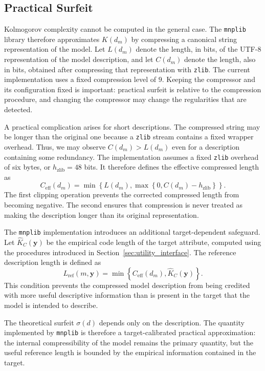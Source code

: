 \subsection*{Practical Surfeit}

Kolmogorov complexity cannot be computed in the general case. The \texttt{mnplib} library therefore approximates $K(d_m)$ by compressing a canonical string representation of the model. Let $L(d_m)$ denote the length, in bits, of the UTF-8 representation of the model description, and let $C(d_m)$ denote the length, also in bits, obtained after compressing that representation with \texttt{zlib}. The current implementation uses a fixed compression level of $9$. Keeping the compressor and its configuration fixed is important: practical surfeit is relative to the compression procedure, and changing the compressor may change the regularities that are detected.

A practical complication arises for short descriptions. The compressed string may be longer than the original one because a \texttt{zlib} stream contains a fixed wrapper overhead. Thus, we may observe $C(d_m)>L(d_m)$ even for a description containing some redundancy. The implementation assumes a fixed \texttt{zlib} overhead of six bytes, or $h_{\mathrm{zlib}}=48$ bits. It therefore defines the effective compressed length as
\[
C_{\mathrm{eff}}(d_m) = \min\left\{L(d_m), \max\left\{0, C(d_m)-h_{\mathrm{zlib}}\right\}\right\}.
\]
The first clipping operation prevents the corrected compressed length from becoming negative. The second ensures that compression is never treated as making the description longer than its original representation.

The \texttt{mnplib} implementation introduces an additional target-dependent safeguard. Let $\hat K_C(\mathbf{y})$ be the empirical code length of the target attribute, computed using the procedures introduced in Section~\ref{sec:utility_interface}. The reference description length is defined as
\[
L_{\mathrm{ref}}(m,\mathbf{y}) = \min\left\{C_{\mathrm{eff}}(d_m), \hat K_C(\mathbf{y}) \right\}.
\]
This condition prevents the compressed model description from being credited with more useful descriptive information than is present in the target that the model is intended to describe.

The theoretical surfeit $\sigma(d)$ depends only on the description. The quantity implemented by \texttt{mnplib} is therefore a target-calibrated practical approximation: the internal compressibility of the model remains the primary quantity, but the useful reference length is bounded by the empirical information contained in the target.

